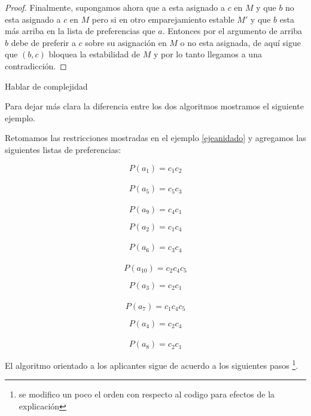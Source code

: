 \begin{proof}
Finalmente, supongamos ahora que a esta asignado a $c$ en $M$ y que $b$ no esta asignado a $c$ en $M$ pero si en otro emparejamiento estable $M'$ y que $b$ esta más arriba en la lista de preferencias que $a$. Entonces por el argumento de arriba $b$ debe de preferir a $c$ sobre su asignación en $M$ o no esta asignada, de aquí sigue que $(b,c)$ bloquea la estabilidad de $M$ y por lo tanto llegamos a una contradicción. 
\end{proof}

Hablar de complejidad

Para dejar más clara la diferencia entre los dos algoritmos mostramos el siguiente ejemplo.

\begin{eje}
Retomamos las restricciones mostradas en el ejemplo \ref{ejeanidado} y agregamos las siguientes listas de preferencias:


 \begin{minipage}{.25\linewidth}
$$P(a_1)=c_1 c_2$$ \\
$$P(a_5)=c_5 c_3$$ \\
$$P(a_9)= c_4 c_1$$
\end{minipage}%
\begin{minipage}{.25\linewidth}
$$P(a_2)= c_1 c_4$$ \\
$$P(a_6)=c_3 c_4$$  \\
$$P(a_{10})=c_2 c_4 c_5$$
\end{minipage}
\begin{minipage}{.25\linewidth}
$$P(a_3)= c_2 c_1$$ \\
$$P(a_7)=c_1 c_4 c_5$$ 
\end{minipage}
\begin{minipage}{.25\linewidth}
$$P(a_4)=c_2 c_4$$ \\
$$P(a_8)=c_2 c_1$$ 
\end{minipage}

El algoritmo orientado a los aplicantes sigue de acuerdo a los siguientes pasos \footnote{se modifico un poco el orden con respecto al codigo para efectos de la explicación}.
\begin{figure}[H]
\begin{minipage}{.5\linewidth}
\begin{figure}[H]\centering

\end{figure}
\end{minipage}
\end{figure}
\end{eje}
